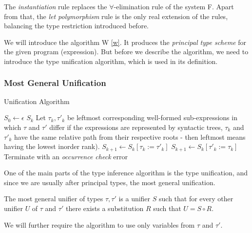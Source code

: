 The \emph{instantiation} rule replaces the $\forall$-elimination rule of the system F. Apart from that, the \emph{let polymorphism} rule is the only real extension of the rules, balancing the type restriction introduced before.

We will introduce the algorithm W \ref{w}. It produces the \emph{principal type scheme} for the given program (expression). But before we describe the algorithm, we need to introduce the type unification algorithm, which is used in its definition.

\subsubsection{Most General Unification}

\begin{algorithm}[t]
\caption{Unification Algorithm \cite{robinson1965machine}}
\label{mgu}
\begin{algorithmic}[1]
    \State $S_0 \gets \epsilon$
        \Return $S_k$
    \EndIf
    \State Let $\tau_k, \tau'_k$ be leftmost corresponding well-formed sub-expressions in which $\tau$ and $\tau'$ differ \Comment if the expressions are represented by syntactic trees, $\tau_k$ and $\tau'_k$ have the same relative path from their respective roots - then leftmost means having the lowest inorder rank).
        \State $S_{k+1} \gets S_k [\tau_k := \tau'_k]$
        \State $S_{k+1} \gets S_k [\tau'_k := \tau_k]$
    \Else
        \State Terminate with an \textit{occurrence check} error
    \EndIf
    \EndFor
\EndFunction
\end{algorithmic}
\end{algorithm}

One of the main parts of the type inference algorithm is the type unification, and since we are usually after principal types, the most general unification.

\begin{defn}
    The most general unifier of types $\tau, \tau'$ is a unifier $S$ such that for every other unifier $U$ of $\tau$ and $\tau'$ there exists a substitution $R$ such that $U = S \circ R$. \cite{damas1982principal}
\end{defn}

We will further require the algorithm to use only variables from $\tau$ and $\tau'$.


